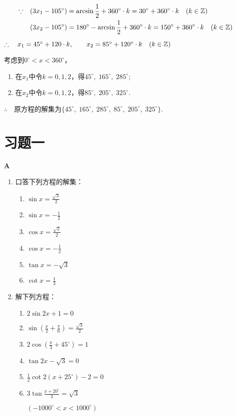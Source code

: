 \begin{solution}
\[\begin{split}
\because\quad &(3x_1-105^{\circ})=\arcsin\dfrac{1}{2}+360^{\circ}\cdot k=30^{\circ}+360^{\circ}\cdot k\quad (k\in\mathbb{Z})   \\
&(3x_2-105^{\circ})=180^{\circ}-\arcsin\dfrac{1}{2}+360^{\circ}\cdot k=150^{\circ}+360^{\circ}\cdot k\quad (k\in\mathbb{Z})   
\end{split}\]

$\therefore\quad x_1=45^{\circ}+120\cdot k,\qquad x_2=85^{\circ}+120^{\circ}\cdot k\quad (k\in\mathbb{Z})$

考虑到$0^{\circ}<x<360^{\circ}$，
\begin{enumerate}
    \item 在$x_1$中令$k=0,1,2$，得$45^{\circ},\; 165^{\circ},\; 285^{\circ}$;
    \item 在$x_2$中令$k=0,1,2$，得$85^{\circ},\; 205^{\circ},\; 325^{\circ}$.
\end{enumerate}

$\therefore\quad $原方程的解集为$\{45^{\circ},\; 165^{\circ},\; 285^{\circ},\; 85^{\circ},\; 205^{\circ},\; 325^{\circ}\}$.
\end{solution}

\section*{习题一}
\begin{center}
    \bfseries A
\end{center}
\begin{enumerate}
    \item 口答下列方程的解集：
\begin{multicols}{3}
\begin{enumerate}[(1)]
    \item $\sin x=\frac{\sqrt{3}}{2}$
    \item $\sin x=-\frac{1}{2}$
    \item $\cos x=\frac{\sqrt{2}}{2}$
    \item $\cos x=-\frac{1}{2}$
    \item $\tan x=-\sqrt{3}$
    \item $\cot x=\frac{1}{3}$
\end{enumerate}
\end{multicols}
    \item 解下列方程：
  \begin{multicols}{2}
\begin{enumerate}[(1)]
    \item $2\sin2x+1=0$
    \item $\sin\left(\frac{x}{2}+\frac{\pi}{6}\right)=\frac{\sqrt{3}}{2}$
    \item $2\cos\left(\frac{\pi}{3}+45^{\circ}\right)=1$
    \item $\tan 2x-\sqrt{3}=0$
    \item $\frac{1}{2}\cot 2(x+25^{\circ})-2=0$
    \item $3\tan\frac{x+20^{\circ}}{3}=\sqrt{3}$ 
    
$(-1000^{\circ}<x<1000^{\circ})$
\end{enumerate}
\end{multicols}
\end{enumerate}

